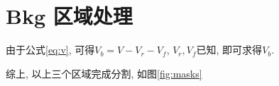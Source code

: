 \section{Bkg 区域处理}
由于公式\ref{eq:v}, 可得$V_b = V - V_r - V_f$, $V_r, V_f$已知, 即可求得$V_b$. 

综上, 以上三个区域完成分割, 如图\ref{fig:masks}



